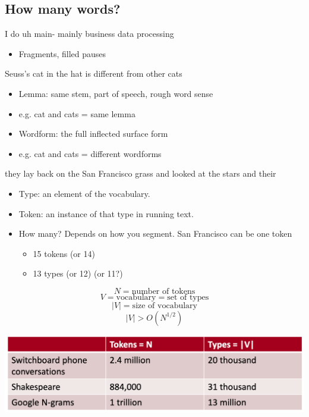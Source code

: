 \documentclass[11pt]{article}
\theoremstyle{definition}
\begin{document}
\subsection{How many words?}
I do uh main- mainly business data processing

\begin{itemize}
  \item Fragments, filled pauses
\end{itemize}

Seuss’s cat in the hat is different from other cats

\begin{itemize}
  \item Lemma: same stem, part of speech, rough word sense
  \item e.g. cat and cats = same lemma
  \item Wordform: the full inflected surface form
  \item e.g. cat and cats = different wordforms
\end{itemize}

they lay back on the San Francisco grass and looked at the stars and their

\begin{itemize}
  \item Type: an element of the vocabulary.
  \item Token: an instance of that type in running text.
  \item How many? Depends on how you segment. San Francisco can be one token
  \begin{itemize}
    \item 15 tokens (or 14)
    \item 13 types (or 12) (or 11?)
  \end{itemize}
\end{itemize}

\begin{equation}
  N = \text{number of tokens} 
\end{equation}
\begin{equation}
  V = \text{vocabulary} = \text{set of types} 
\end{equation}
\begin{equation}
  |V| = \text{size of vocabulary}
\end{equation}
\begin{equation}
  |V| > O(N^{1/2})
\end{equation}

\includegraphics[width=\textwidth]{1.png}
\end{document}
